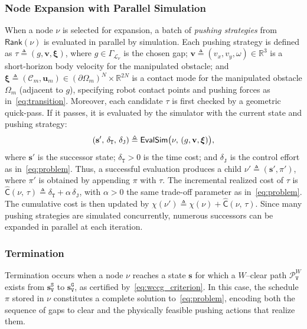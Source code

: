 \subsubsection{Node Expansion with Parallel Simulation}
When a node $\nu$ is selected for expansion, a batch of \emph{pushing
strategies} from $\mathsf{Rank}(\nu)$ is evaluated in parallel by simulation.
Each pushing strategy is defined as
\(\tau\triangleq(g,\mathbf{v},\boldsymbol{\xi})\), 
where $g\in \Gamma_{\mathcal{L}_\nu}$ is the chosen gap;
$\mathbf{v}\triangleq(v_x,v_y,\omega)\in \mathbb{R}^3$ is a short-horizon body
velocity for the manipulated obstacle;
and $\boldsymbol{\xi}\triangleq (\mathcal{C}_m,\mathbf{u}_m) \in (\partial\Omega_m)^N \times \mathbb{R}^{2N}$ 
is a contact mode for the manipulated obstacle $\Omega_m$ (adjacent to $g$), 
specifying robot contact points and pushing forces as in~\eqref{eq:transition}.
Moreover, each candidate $\tau$ is first checked by a geometric quick-pass. If it passes,
it is evaluated by the simulator with the current state and pushing strategy:
\begin{equation}\label{eq:sim}
  (\mathbf{s}',\, \delta_\texttt{T},\, \delta_{\texttt{J}}) \triangleq \mathsf{EvalSim}
  \big{(}\nu,\, (g,\mathbf{v},\boldsymbol{\xi})\big{)},
\end{equation}
where $\mathbf{s}'$ is the successor state; $\delta_\texttt{T}>0$ is the time
cost; and $\delta_\texttt{J}$ is the control effort as in~\eqref{eq:problem}.
Thus, a successful evaluation produces a child
$\nu'\triangleq (\mathbf{s}',\pi')$, where $\pi'$ is obtained by appending
$\pi$ with $\tau$. The incremental realized cost of $\tau$ is
$\widehat{\mathsf{C}}(\nu,\,\tau)\triangleq \delta_\texttt{T} + \alpha\, \delta_\texttt{J}$,
with $\alpha>0$ the same trade-off parameter as in~\eqref{eq:problem}. The
cumulative cost is then updated by
$\chi(\nu')\triangleq \chi(\nu)+\widehat{\mathsf{C}}(\nu,\,\tau)$. Since many
pushing strategies are simulated concurrently, numerous successors can be
expanded in parallel at each iteration.

\subsubsection{Termination}
Termination occurs when a node $\nu$ reaches a state $\mathbf{s}$ for which a
$W$--clear path $\mathcal{P}^W_\texttt{V}$ exists from
$\mathbf{s}_\texttt{V}^{\texttt{S}}$ to $\mathbf{s}_\texttt{V}^{\texttt{G}}$,
as certified by~\eqref{eq:wccg_criterion}. In this case, the schedule $\pi$
stored in $\nu$ constitutes a complete solution to~\eqref{eq:problem}, encoding
both the sequence of gaps to clear and the physically feasible pushing actions
that realize them.

